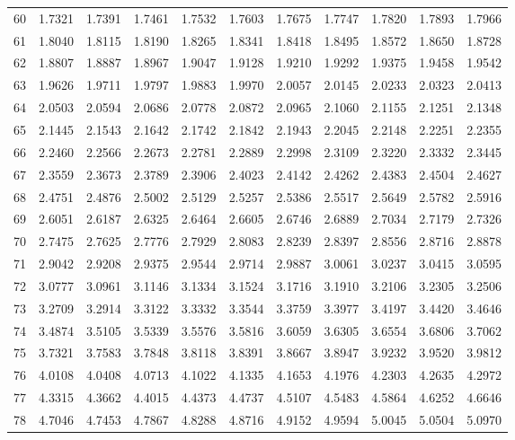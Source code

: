 {\begin{tabular}{|c|cccccccccc|}
\hline
60 & 1.7321 & 1.7391 & 1.7461 & 1.7532 & 1.7603 & 1.7675 & 1.7747 & 1.7820 & 1.7893 & 1.7966 \\
61 & 1.8040 & 1.8115 & 1.8190 & 1.8265 & 1.8341 & 1.8418 & 1.8495 & 1.8572 & 1.8650 & 1.8728 \\
62 & 1.8807 & 1.8887 & 1.8967 & 1.9047 & 1.9128 & 1.9210 & 1.9292 & 1.9375 & 1.9458 & 1.9542 \\
63 & 1.9626 & 1.9711 & 1.9797 & 1.9883 & 1.9970 & 2.0057 & 2.0145 & 2.0233 & 2.0323 & 2.0413 \\
64 & 2.0503 & 2.0594 & 2.0686 & 2.0778 & 2.0872 & 2.0965 & 2.1060 & 2.1155 & 2.1251 & 2.1348 \\
\hline
65 & 2.1445 & 2.1543 & 2.1642 & 2.1742 & 2.1842 & 2.1943 & 2.2045 & 2.2148 & 2.2251 & 2.2355 \\
66 & 2.2460 & 2.2566 & 2.2673 & 2.2781 & 2.2889 & 2.2998 & 2.3109 & 2.3220 & 2.3332 & 2.3445 \\
67 & 2.3559 & 2.3673 & 2.3789 & 2.3906 & 2.4023 & 2.4142 & 2.4262 & 2.4383 & 2.4504 & 2.4627 \\
68 & 2.4751 & 2.4876 & 2.5002 & 2.5129 & 2.5257 & 2.5386 & 2.5517 & 2.5649 & 2.5782 & 2.5916 \\
69 & 2.6051 & 2.6187 & 2.6325 & 2.6464 & 2.6605 & 2.6746 & 2.6889 & 2.7034 & 2.7179 & 2.7326 \\
\hline
70 & 2.7475 & 2.7625 & 2.7776 & 2.7929 & 2.8083 & 2.8239 & 2.8397 & 2.8556 & 2.8716 & 2.8878 \\
71 & 2.9042 & 2.9208 & 2.9375 & 2.9544 & 2.9714 & 2.9887 & 3.0061 & 3.0237 & 3.0415 & 3.0595 \\
72 & 3.0777 & 3.0961 & 3.1146 & 3.1334 & 3.1524 & 3.1716 & 3.1910 & 3.2106 & 3.2305 & 3.2506 \\
73 & 3.2709 & 3.2914 & 3.3122 & 3.3332 & 3.3544 & 3.3759 & 3.3977 & 3.4197 & 3.4420 & 3.4646 \\
74 & 3.4874 & 3.5105 & 3.5339 & 3.5576 & 3.5816 & 3.6059 & 3.6305 & 3.6554 & 3.6806 & 3.7062 \\
\hline
75 & 3.7321 & 3.7583 & 3.7848 & 3.8118 & 3.8391 & 3.8667 & 3.8947 & 3.9232 & 3.9520 & 3.9812 \\
76 & 4.0108 & 4.0408 & 4.0713 & 4.1022 & 4.1335 & 4.1653 & 4.1976 & 4.2303 & 4.2635 & 4.2972 \\
77 & 4.3315 & 4.3662 & 4.4015 & 4.4373 & 4.4737 & 4.5107 & 4.5483 & 4.5864 & 4.6252 & 4.6646 \\
78 & 4.7046 & 4.7453 & 4.7867 & 4.8288 & 4.8716 & 4.9152 & 4.9594 & 5.0045 & 5.0504 & 5.0970 \\

\end{tabular}}
